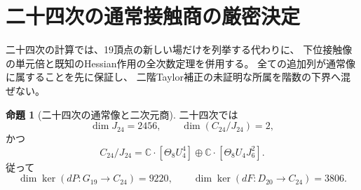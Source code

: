 \documentclass[a4paper,11pt]{ltjsarticle}
\theoremstyle{definition}
\newtheorem{proposition}[theorem]{命題}
\begin{document}


\section{二十四次の通常接触商の厳密決定}
\label{sec:v17-contact-rank}

二十四次の計算では、19頂点の新しい場だけを列挙する代わりに、
下位接触像の単元倍と既知のHessian作用の全次数定理を併用する。
全ての追加列が通常像に属することを先に保証し、
二階Taylor補正の未証明な所属を階数の下界へ混ぜない。

\begin{proposition}[二十四次の通常像と二次元商]
\label{prop:v17-ordinary-contact-rank24}
二十四次では
\[
 \dim J_{24}=2456,\qquad
 \dim(C_{24}/J_{24})=2,
\]
かつ
\[
 C_{24}/J_{24}
 =\mathbb C\cdot[\Theta_8U_4^4]
   \oplus\mathbb C\cdot[\Theta_8U_4J_6^2].
\]
従って
\[
 \dim\ker(dP:G_{19}\to C_{24})=9220,\qquad
 \dim\ker(dF:D_{20}\to C_{24})=3806.
\]
\end{proposition}
\end{document}
